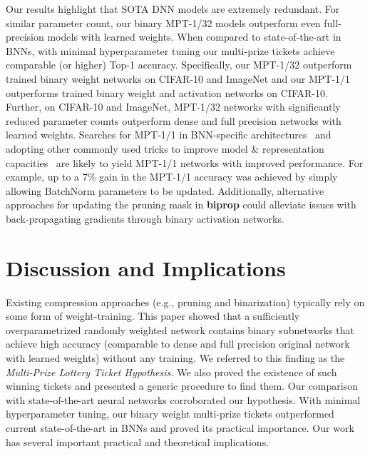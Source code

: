 \documentclass{article} \usepackage{iclr2021_conference,times}
\begin{document}
Our results highlight that SOTA DNN models are extremely redundant. 
For similar parameter count, our binary MPT-1/32 models outperform even full-precision models with learned weights. 
When compared to state-of-the-art in BNNs, with minimal hyperparameter tuning our multi-prize tickets achieve comparable (or higher) Top-1 accuracy.
Specifically, our MPT-1/32 outperform trained binary weight networks on CIFAR-10 and ImageNet and our MPT-1/1 outperforms trained binary weight and activation networks on CIFAR-10. Further, on CIFAR-10 and ImageNet, MPT-1/32 networks with significantly reduced parameter counts outperform dense and full precision networks with learned weights.
Searches for MPT-1/1 in BNN-specific architectures~\citep{bnas,bats} and adopting other commonly used tricks to improve model \& representation capacities~\citep{highcapacity,slbn,rbnn,siman} are likely to yield MPT-1/1 networks with improved performance.
For example, up to a 7\% gain in the MPT-1/1 accuracy was achieved by simply allowing BatchNorm parameters to be updated.
Additionally, alternative approaches for updating the pruning mask in \textbf{biprop} could alleviate issues with back-propagating gradients through binary activation networks. 

\section{Discussion and Implications}

Existing compression approaches (e.g., pruning and binarization) typically rely on some form of weight-training. This paper showed that a sufficiently overparametrized randomly weighted network contains binary subnetworks that achieve high accuracy (comparable to dense and full precision original network with learned weights) without any training. We referred to this finding as the \emph{Multi-Prize Lottery Ticket Hypothesis.} We also proved the existence of such winning tickets and presented a generic procedure to find them. 
Our comparison with state-of-the-art neural networks corroborated our hypothesis. 
With minimal hyperparameter tuning, our binary weight multi-prize tickets outperformed current state-of-the-art in BNNs and proved its practical importance.
Our work has several important practical and theoretical implications.
\end{document}
